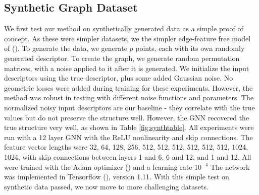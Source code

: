 \documentclass{article} %
\begin{document}
\subsection{Synthetic Graph Dataset}
We first test our method on synthetically generated data as a simple proof of concept.
As these were simpler datasets, we the simpler edge-feature free model of (\cite{kipf2017semi}).
To generate the data, we generate $p$ points, each with its own randomly generated descriptor.
To create the graph, we generate random permutation matrices, with a noise applied to it after it is generated.
We initialize the input descriptors using the true descriptor, plus some added Gaussian noise.
No geometric losses were added during training for these experiments.
However, the method was robust in testing with different noise functions and parameters.
The normalized noisy input descriptors are our baseline - they correlate with the true values but do not preserve the structure well.
However, the GNN recovered the true structure very well, as shown in Table \ref{fig:synthtable}.
All experiments were run with a 12 layer GNN with the ReLU nonlinearity and skip connections.
The feature vector lengths were 32, 64, 128, 256, 512, 512, 512, 512, 512, 512, 1024, 1024, with skip connections between layers 1 and 6, 6 and 12, and 1 and 12.
All were trained with the Adam optimizer (\cite{kingma2014adam}) and a learning rate $10^{-4}$
The network was implemented in Tensorflow (\cite{tensorflow2015}), version 1.11.
With this simple test on synthetic data passed, we now move to more challenging datasets.
\end{document}
